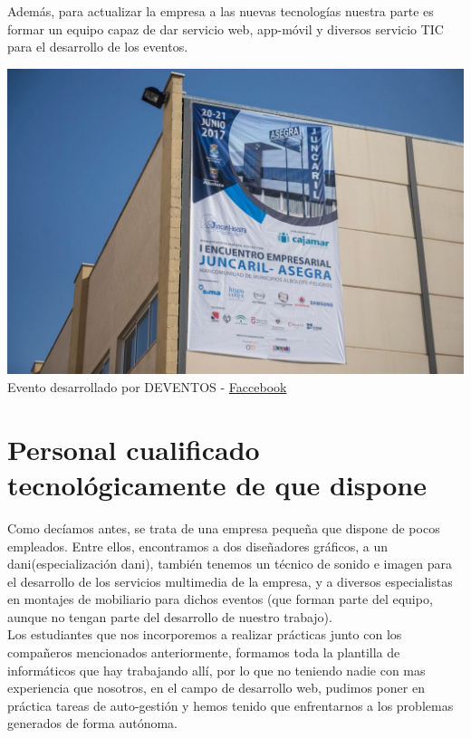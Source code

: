 		Además, para actualizar la empresa a las nuevas tecnologías nuestra parte es formar un equipo capaz de dar servicio web, app-móvil y diversos servicio TIC para el desarrollo de los eventos. \\
		
		\begin{center}
			\includegraphics[scale=0.45]{image/asegra.jpg}\\
			Evento desarrollado por DEVENTOS - \href{https://www.facebook.com/encuentrojuncarilasegra/}{Faccebook}
		\end{center}
		
		\newpage
		
		\section{Personal cualificado tecnológicamente de que dispone}
		Como decíamos antes, se trata de una empresa pequeña que dispone de pocos empleados. Entre ellos, encontramos a dos diseñadores gráficos, a un dani(especialización dani), también tenemos un técnico de sonido e imagen para el desarrollo de los servicios multimedia de la empresa, y a diversos especialistas en montajes de mobiliario para dichos eventos (que forman parte del equipo, aunque no tengan parte del desarrollo de nuestro trabajo). \\ 
		
		Los estudiantes que nos incorporemos a realizar prácticas junto con los compañeros mencionados anteriormente, formamos toda la plantilla de informáticos que hay trabajando allí, por lo que no teniendo nadie con mas experiencia que nosotros, en el campo de desarrollo web, pudimos poner en práctica tareas de auto-gestión y hemos tenido que enfrentarnos a los problemas generados de forma autónoma. 
		
